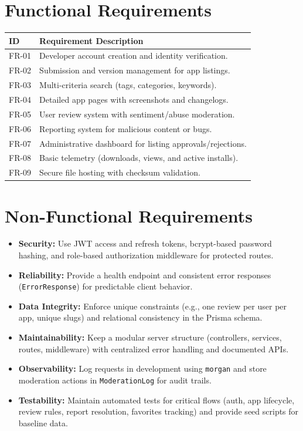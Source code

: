 \documentclass[12pt,a4paper]{article}
\begin{document}
\section{Functional Requirements}
\begin{longtable}{|l|p{}|}
\hline
\rowcolor{gray!10} \textbf{ID} & \textbf{Requirement Description} \\ \hline
FR-01 & Developer account creation and identity verification. \\ \hline
FR-02 & Submission and version management for app listings. \\ \hline
FR-03 & Multi-criteria search (tags, categories, keywords). \\ \hline
FR-04 & Detailed app pages with screenshots and changelogs. \\ \hline
FR-05 & User review system with sentiment/abuse moderation. \\ \hline
FR-06 & Reporting system for malicious content or bugs. \\ \hline
FR-07 & Administrative dashboard for listing approvals/rejections. \\ \hline
FR-08 & Basic telemetry (downloads, views, and active installs). \\ \hline
FR-09 & Secure file hosting with checksum validation. \\ \hline
\end{longtable}

\section{Non-Functional Requirements}
\begin{itemize}
    \item \textbf{Security:} Use JWT access and refresh tokens, bcrypt-based password hashing, and role-based authorization middleware for protected routes.
    \item \textbf{Reliability:} Provide a health endpoint and consistent error responses (\texttt{ErrorResponse}) for predictable client behavior.
    \item \textbf{Data Integrity:} Enforce unique constraints (e.g., one review per user per app, unique slugs) and relational consistency in the Prisma schema.
    \item \textbf{Maintainability:} Keep a modular server structure (controllers, services, routes, middleware) with centralized error handling and documented APIs.
    \item \textbf{Observability:} Log requests in development using \texttt{morgan} and store moderation actions in \texttt{ModerationLog} for audit trails.
    \item \textbf{Testability:} Maintain automated tests for critical flows (auth, app lifecycle, review rules, report resolution, favorites tracking) and provide seed scripts for baseline data.
\end{itemize}
\end{document}
